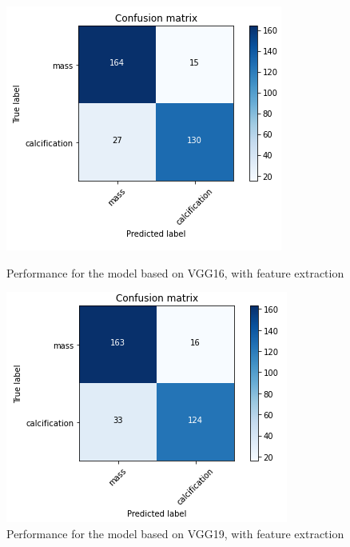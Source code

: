 \documentclass[11pt,a4paper,oneside]{article}
\begin{document}
\begin{figure}[h]
	\begin{minipage}[c]{.4\textwidth}
		\centering\setlength{\captionmargin}{0pt}%
		\includegraphics[width=.9\textwidth]{images/Task 3/VGG16 3.1/FE/Conf_Matrix}
		\caption{Performance for the model based on VGG16, with feature extraction}
		\label{fig:vgg16_3.1_matrix_fe}
	\end{minipage}
	\hspace{5mm}%
	\begin{minipage}[c]{.4\textwidth}
		\centering\setlength{\captionmargin}{0pt}%
		\includegraphics[width=.9\textwidth]{images/Task 3/VGG19 3.1/FE/Conf_Matrix}
		\caption{Performance for the model based on VGG19, with feature extraction}
		\label{fig:vgg19_3.1_matrix_fe}
	\end{minipage}
\end{figure}
\end{document}
